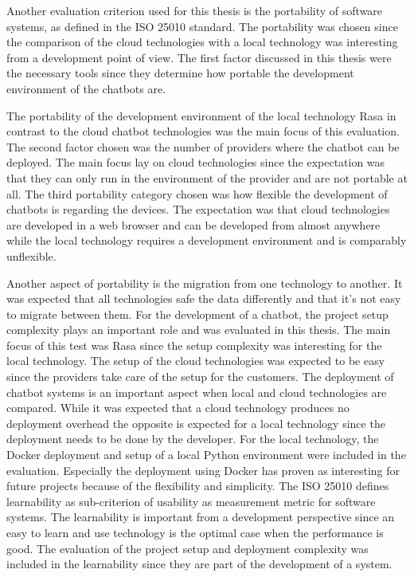 Another evaluation criterion used for this thesis is the portability of software systems, as defined in the ISO 25010\cite{iso25010} standard.
The portability was chosen since the comparison of the cloud 
technologies with a local technology was interesting from a 
development point of view.
The first factor discussed in this thesis were the necessary tools 
since they determine how portable the development environment of the 
chatbots are.

The portability of the development environment of the local technology 
Rasa in contrast to the cloud chatbot technologies was the 
main focus of this evaluation.
The second factor chosen was the number of providers where the 
chatbot can be deployed.
The main focus lay on cloud technologies since the expectation was
that they can only run in the environment of the provider and are 
not portable at all.
The third portability category chosen was how flexible the development
of chatbots is regarding the devices.
The expectation was that cloud technologies are developed in a 
web browser and can be developed from almost anywhere while 
the local technology requires a development environment and is 
comparably unflexible.

Another aspect of portability is the migration from one technology to another.
It was expected that all technologies safe the data differently and that it's not easy to migrate between them.
For the development of a chatbot, the project setup complexity plays an important role and was evaluated in this thesis.
The main focus of this test was Rasa since the setup complexity was interesting for the local technology.
The setup of the cloud technologies was expected to be easy since the providers take care of the setup for the customers.
The deployment of chatbot systems is an important aspect when local and cloud technologies are compared.
While it was expected that a cloud technology produces no deployment overhead the opposite is expected for a local technology since the deployment needs to 
be done by the developer.
For the local technology, the Docker deployment and setup of a local Python environment were included in the evaluation.
Especially the deployment using Docker has proven as interesting for 
future projects because of the flexibility and simplicity. 
The ISO 25010\cite{iso25010} defines learnability as sub-criterion of usability as measurement metric for software systems.
The learnability is important from a development perspective since an easy to learn and use technology is the optimal case when the performance is good.
The evaluation of the project setup and deployment complexity was included in the learnability since they are part of the development of a system.

